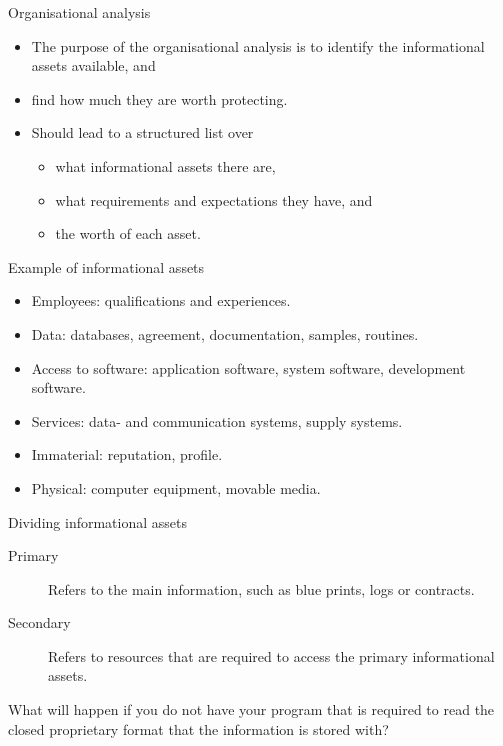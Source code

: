 \documentclass{beamer}
\begin{document}
\begin{frame}{Organisational analysis}
  \begin{itemize}
    \item The purpose of the organisational analysis is to identify the
      informational assets available, and 

    \item find how much they are worth protecting.

    \item Should lead to a structured list over
      \begin{itemize}
        \item what informational assets there are,
        \item what requirements and expectations they have, and 
        \item the worth of each asset.
      \end{itemize}

  \end{itemize}
\end{frame}

\begin{frame}{Example of informational assets}
  \begin{itemize}
    \item Employees: qualifications and experiences.
    \item Data: databases, agreement, documentation, samples, routines.
    \item Access to software: application software, system software, 
      development software.
    \item Services: data- and communication systems, supply systems.
    \item Immaterial: reputation, profile.
    \item Physical: computer equipment, movable media.
  \end{itemize}
\end{frame}

\begin{frame}{Dividing informational assets}
  \begin{description}
    \item[Primary] Refers to the main information, such as blue prints, logs or
      contracts.

    \item[Secondary] Refers to resources that are required to access the primary
      informational assets.

  \end{description}
  What will happen if you do not have your program that is required to read the
  closed proprietary format that the information is stored with?

\end{frame}
\end{document}
